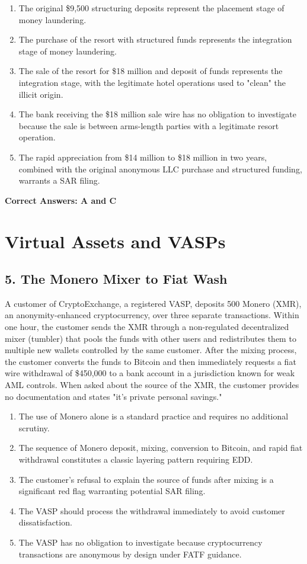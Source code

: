 \documentclass[11pt,a4paper]{article}
\begin{document}
	\begin{enumerate}[label=\Alph*.]
		\item The original \$9,500 structuring deposits represent the placement stage of money laundering.
		\item The purchase of the resort with structured funds represents the integration stage of money laundering.
		\item The sale of the resort for \$18 million and deposit of funds represents the integration stage, with the legitimate hotel operations used to "clean" the illicit origin.
		\item The bank receiving the \$18 million sale wire has no obligation to investigate because the sale is between arms-length parties with a legitimate resort operation.
		\item The rapid appreciation from \$14 million to \$18 million in two years, combined with the original anonymous LLC purchase and structured funding, warrants a SAR filing.
	\end{enumerate}
	
	\textbf{Correct Answers: A and C}
	
	\section{Virtual Assets and VASPs}
	
	\subsection{5. The Monero Mixer to Fiat Wash}
	
	A customer of CryptoExchange, a registered VASP, deposits 500 Monero (XMR), an anonymity-enhanced cryptocurrency, over three separate transactions. Within one hour, the customer sends the XMR through a non-regulated decentralized mixer (tumbler) that pools the funds with other users and redistributes them to multiple new wallets controlled by the same customer. After the mixing process, the customer converts the funds to Bitcoin and then immediately requests a fiat wire withdrawal of \$450,000 to a bank account in a jurisdiction known for weak AML controls. When asked about the source of the XMR, the customer provides no documentation and states "it's private personal savings."
	
	\begin{enumerate}[label=\Alph*.]
		\item The use of Monero alone is a standard practice and requires no additional scrutiny.
		\item The sequence of Monero deposit, mixing, conversion to Bitcoin, and rapid fiat withdrawal constitutes a classic layering pattern requiring EDD.
		\item The customer's refusal to explain the source of funds after mixing is a significant red flag warranting potential SAR filing.
		\item The VASP should process the withdrawal immediately to avoid customer dissatisfaction.
		\item The VASP has no obligation to investigate because cryptocurrency transactions are anonymous by design under FATF guidance.
	\end{enumerate}
	
\end{document}
